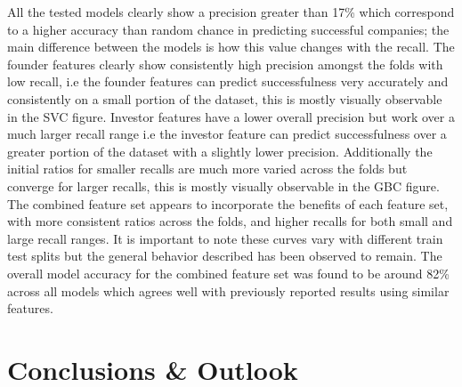 \documentclass{article}
\begin{document}
All the tested models clearly show a precision greater than 17\% which correspond to a higher accuracy than random chance in predicting successful companies; the main difference between the models is how this value changes with the recall. The founder features clearly show consistently high precision amongst the folds with low recall, i.e the founder features can predict successfulness very accurately and consistently on a small portion of the dataset, this is mostly visually observable in the SVC figure. Investor features have a lower overall precision but work over a much larger recall range i.e the investor feature can predict successfulness over a greater portion of the dataset with a slightly lower precision. Additionally the initial ratios for smaller recalls are much more varied across the folds but converge for larger recalls, this is mostly visually observable in the GBC figure. The combined feature set appears to incorporate the benefits of each feature set, with more consistent ratios across the folds, and higher recalls for both small and large recall ranges. It is important to note these curves vary with different train test splits but the general behavior described has been observed to remain. The overall model accuracy for the combined feature set was found to be around 82\% across all models which agrees well with previously reported results using similar features.


\section{Conclusions \& Outlook}
\label{sec:conclusion_outlook}
\end{document}
